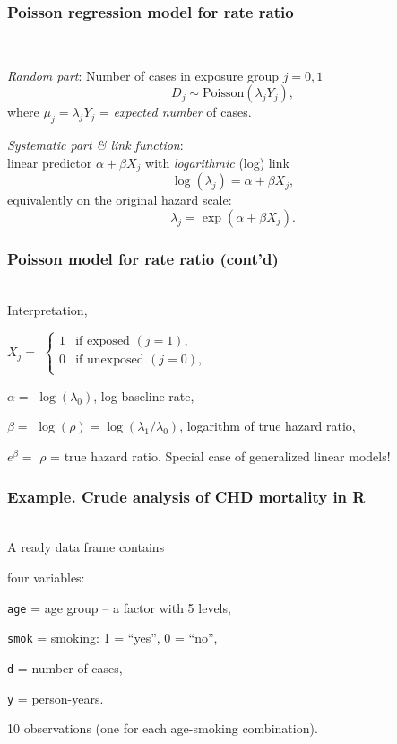 \documentclass[handout, 12pt]{beamer}
\begin{document}

\begin{frame}[fragile] \frametitle{Poisson regression model for rate ratio}
\ \\
\bi
\item {\it Random part}: Number of cases in exposure group $j = 0,1$
$$ D_j \sim \mbox{Poisson}(\lambda_j Y_j) , $$
where $\mu_j = \lambda_j Y_j$ = {\it expected number} of cases.
\bigskip
\item {\it Systematic part \& link function}:\\ linear predictor $\alpha + \beta X_j$ with {\it logarithmic} (log) link 
$$ \log(\lambda_j) = \alpha + \beta X_j , $$
equivalently on the original hazard scale:
$$ \lambda_j = \exp(\alpha + \beta X_j) . $$
\ei
\end{frame} 



\begin{frame}[fragile] \frametitle{Poisson model for rate ratio (cont'd)}
\ \\
Interpretation,
\bi
\item[{ }] $X_j=$ $\begin{cases}
		1  & \text{if exposed } (j=1), \\
            0  & \text{if unexposed } (j=0),\\
		\end{cases}$
		\medskip
\item[{ }] $\alpha=$  $\log(\lambda_0)$, log-baseline rate,
\medskip
\item[{ }] $\beta=$ $\log(\rho) = \log(\lambda_1/\lambda_0)$, 
                logarithm of true hazard ratio,
     \medskip           
\item[{ }] $e^{\beta}=$ $\rho$ = true hazard ratio.
\ei
Special case of generalized linear models!
\end{frame} 


\begin{frame}[fragile] \frametitle{Example.  Crude analysis of CHD mortality in R}
\ \\
A ready data frame contains
\bi
\item four variables: 
  \bi
   \item[ ] {\tt age} = age group -- a {factor} with 5 levels,
   \medskip
   \item[ ]
        {\tt smok} = smoking: 1 = ``yes'', 0 = ``no'',\medskip
   \item[ ]        
        {\tt d} = number of cases, \medskip
   \item[ ]
        {\tt y} = person-years.
  \ei
\item 10 observations (one for each age-smoking combination).
\ei
\end{frame} 
\end{document}
